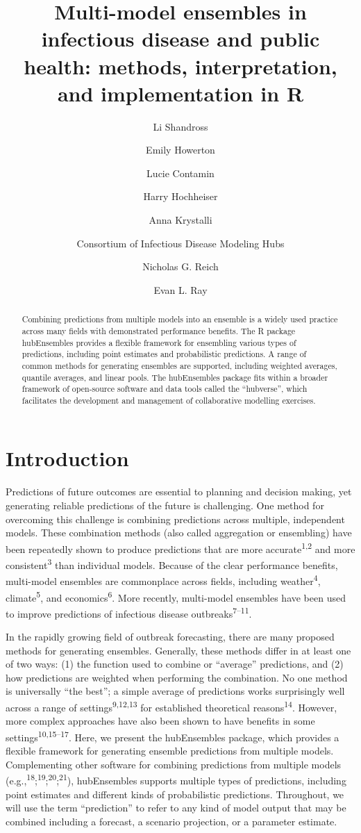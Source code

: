 \documentclass[
  letterpaper,
  DIV=11,
  numbers=noendperiod]{scrartcl}
\title{Multi-model ensembles in infectious disease and public health:
methods, interpretation, and implementation in R}
\author{Li Shandross \and Emily Howerton \and Lucie Contamin \and Harry
Hochheiser \and Anna Krystalli \and Consortium of Infectious Disease
Modeling Hubs \and Nicholas G. Reich \and Evan L. Ray}
\date{}
\begin{document}
\maketitle
\begin{abstract}
Combining predictions from multiple models into an ensemble is a widely
used practice across many fields with demonstrated performance benefits.
The {R} package {hubEnsembles} provides a flexible framework for
ensembling various types of predictions, including point estimates and
probabilistic predictions. A range of common methods for generating
ensembles are supported, including weighted averages, quantile averages,
and linear pools. The {hubEnsembles} package fits within a broader
framework of open-source software and data tools called the
``hubverse'', which facilitates the development and management of
collaborative modelling exercises.
\end{abstract}

\section{Introduction}\label{sec-intro}

Predictions of future outcomes are essential to planning and decision
making, yet generating reliable predictions of the future is
challenging. One method for overcoming this challenge is combining
predictions across multiple, independent models. These combination
methods (also called aggregation or ensembling) have been repeatedly
shown to produce predictions that are more accurate\textsuperscript{1,2}
and more consistent\textsuperscript{3} than individual models. Because
of the clear performance benefits, multi-model ensembles are commonplace
across fields, including weather\textsuperscript{4},
climate\textsuperscript{5}, and economics\textsuperscript{6}. More
recently, multi-model ensembles have been used to improve predictions of
infectious disease outbreaks\textsuperscript{7--11}.

In the rapidly growing field of outbreak forecasting, there are many
proposed methods for generating ensembles. Generally, these methods
differ in at least one of two ways: (1) the function used to combine or
``average'' predictions, and (2) how predictions are weighted when
performing the combination. No one method is universally ``the best''; a
simple average of predictions works surprisingly well across a range of
settings\textsuperscript{9,12,13} for established theoretical
reasons\textsuperscript{14}. However, more complex approaches have also
been shown to have benefits in some settings\textsuperscript{10,15--17}.
Here, we present the {hubEnsembles} package, which provides a flexible
framework for generating ensemble predictions from multiple models.
Complementing other software for combining predictions from multiple
models
(e.g.,\textsuperscript{18};\textsuperscript{19};\textsuperscript{20};\textsuperscript{21}),
{hubEnsembles} supports multiple types of predictions, including point
estimates and different kinds of probabilistic predictions. Throughout,
we will use the term ``prediction'' to refer to any kind of model output
that may be combined including a forecast, a scenario projection, or a
parameter estimate.
\end{document}
